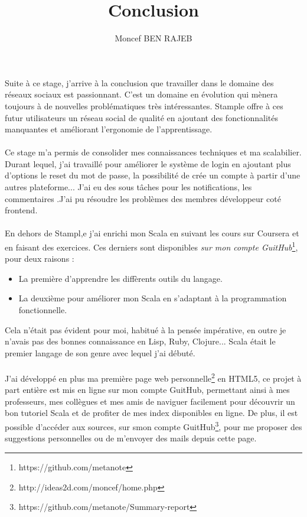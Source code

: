 \documentclass[11pt]{article} %
\title{Conclusion}
\author{Moncef BEN RAJEB}
\begin{document}
\maketitle


 Suite à ce stage, j’arrive à la conclusion que travailler dans le domaine des réseaux sociaux est passionnant. C’est un domaine en évolution qui mènera toujours à de nouvelles problématiques très intéressantes.
Stample offre à ces futur utilisateurs un réseau social de qualité en ajoutant des fonctionnalités manquantes et améliorant l'ergonomie de l'apprentissage.
\paragraph{}
Ce stage m'a permis de consolider mes connaissances techniques et ma scalabilier.
Durant lequel, j'ai travaillé pour améliorer le système de login en ajoutant plus d'options le reset du mot de passe, la possibilité de crée un compte à partir d'une autres plateforme...
J'ai eu des sous tâches pour les notifications, les commentaires .J'ai pu résoudre les problèmes des membres développeur coté frontend.
 \paragraph{}
En dehors de Stampl,e j'ai enrichi mon Scala en suivant les cours sur Coursera et en faisant des exercices. Ces derniers sont disponibles \textit{sur mon compte GuitHub}\footnote{https://github.com/metanote}, pour deux raisons :
\begin{itemize}
\item La première d'apprendre les diffèrents outils du langage.
\item La deuxième pour améliorer mon Scala en s'adaptant à la programmation fonctionnelle.
\end{itemize}
Cela n'était pas évident pour moi, habitué à la pensée impérative, en outre je n'avais pas des bonnes connaissance en Lisp, Ruby, Clojure... Scala était le premier langage de son genre avec lequel j'ai débuté.
\paragraph{}
J'ai développé en plus ma première page web personnelle\footnote{http://ideas2d.com/moncef/home.php} en HTML5, ce projet à part entière est mis en ligne sur mon compte GuitHub, permettant ainsi à mes professeurs, mes collègues et mes amis de naviguer facilement pour découvrir un bon tutoriel Scala et de profiter de mes index disponibles en ligne. De plus, il est possible d’accéder aux sources, sur smon compte GuitHub\footnote{https://github.com/metanote/Summary-report}, pour me proposer des suggestions personnelles ou de m'envoyer des mails depuis cette page.
\end{document}
